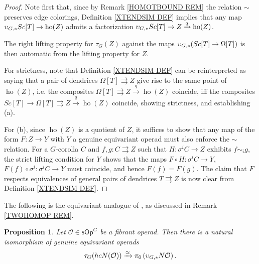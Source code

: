 \documentclass[a4paper,10pt
,draft
]{article}%
\numberwithin{equation}{section}
\numberwithin{figure}{section}
\newtheorem{proposition}[equation]{Proposition}%
\theoremstyle{definition} %
\newcommand{\1}{\ensuremath{\mathbbm 1}}%
\begin{document}
\begin{proof}
	Note first that, 
	since by Remark \ref{HOMOTBOUND REM}
	the relation $\sim$ preserves edge colorings,
	Definition \ref{XTENDSIM DEF} implies that
	any map 
	$\upsilon_{G,\**}Sc[T] \to \mathop{\mathrm{ho}}(Z)$
	admits a factorization 
	$\upsilon_{G,\**}Sc[T] \to Z \xrightarrow{q} \mathop{\mathrm{ho}}(Z)$.
	 
	The right lifting property for $\tau_G(Z)$
	against the maps 
	$\upsilon_{G,\**}(Sc[T] \to \Omega[T])$
	is then automatic from the lifting property for $Z$.

	For strictness,	
	note that Definition \ref{XTENDSIM DEF}
	can be reinterpreted as saying that
	a pair of dendrices $\Omega[T] \rightrightarrows Z$
	give rise to the same point of 
	$\mathop{\mathrm{ho}}(Z)$, i.e. 
	the composites 
	$\Omega[T] \rightrightarrows Z \xrightarrow{q}
	\mathop{\mathrm{ho}}(Z)$ coincide, 
	iff the composites 
	$Sc[T] \to \Omega[T] \rightrightarrows Z \xrightarrow{q}
	\mathop{\mathrm{ho}}(Z)$ coincide, showing strictness, and establishing (a).
		
	For (b), since $\mathop{\mathrm{ho}}(Z)$ is a quotient of
	$Z$, it suffices to show that any map
	of the form $F \colon Z \to Y$ with $Y$ a genuine equivariant operad must also enforce the $\sim$ relation.
	For a $G$-corolla $C$ and
	$f,g\colon C \rightrightarrows Z$ such that 
	$H \colon \sigma^i C \to Z$ exhibits
	$f \sim_i g$, 
	the strict lifting condition for $Y$
	shows that the maps
	$F\circ H \colon \sigma^i C \to Y$,
	$F(f) \circ \sigma^i \colon \sigma^i C \to Y$
	must coincide, and hence $F(f)=F(g)$.
	The claim that $F$ respects equivalences
	of general pairs of dendrices $T \rightrightarrows Z$
	is now clear from Definition \ref{XTENDSIM DEF}.
\end{proof}



The following is the equivariant analogue of \cite[Prop. 4.8]{CM13b},
as discussed in Remark \ref{TWOHOMOP REM}.


\begin{proposition}\label{HOOPID_PROP}
Let $\mathcal{O} \in \mathsf{sOp}^G$
be a fibrant operad. 
Then there is a natural isomorphism of genuine equivariant operads
\begin{equation}\label{HOOPID EQ}
\tau_G(hcN(\mathcal{O})) \xrightarrow{\simeq}
\pi_0 \left( \upsilon_{G,\**} N\mathcal{O} \right).
\end{equation}
\end{proposition}
\end{document}
